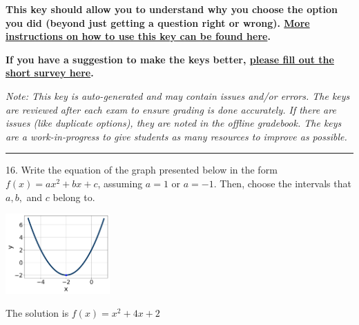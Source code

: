 \documentclass{article}[14pt]
\begin{document}
\textbf{This key should allow you to understand why you choose the option you did (beyond just getting a question right or wrong). \href{https://xronos.clas.ufl.edu/mac1105spring2020/courseDescriptionAndMisc/Exams/LearningFromResults}{More instructions on how to use this key can be found here}.}

\textbf{If you have a suggestion to make the keys better, \href{https://forms.gle/CZkbZmPbC9XALEE88}{please fill out the short survey here}.}

\textit{Note: This key is auto-generated and may contain issues and/or errors. The keys are reviewed after each exam to ensure grading is done accurately. If there are issues (like duplicate options), they are noted in the offline gradebook. The keys are a work-in-progress to give students as many resources to improve as possible.}

\rule{\textwidth}{0.4pt}

16. Write the equation of the graph presented below in the form $f(x)=ax^2+bx+c$, assuming  $a=1$ or $a=-1$. Then, choose the intervals that $a, b,$ and $c$ belong to.
\begin{center} \includegraphics[width=0.3\textwidth]{../Figures/quadraticGraphToEquationC.png} \end{center} 

The solution is $ f(x) = x^{2} +4 x + 2 $ 
\end{document}
